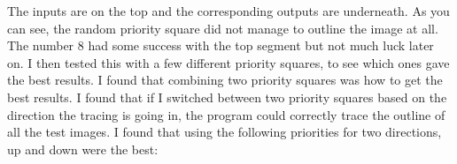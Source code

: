 \documentclass{report}
\begin{document}
\begin{figure}[H]
    \centering
    \label{fig:Test with Example Priority Box}
\end{figure}
\noindent The inputs are on the top and the corresponding outputs are underneath. As you can see, the random priority square did not manage to outline the image at all. The number 8 had some success with the top segment but not much luck later on.
\newline
I then tested this with a few different priority squares, to see which ones gave the best results. I found that combining two priority squares was how to get the best results. I found that if I switched between two priority squares based on the direction the tracing is going in, the program could correctly trace the outline of all the test images. I found that using the following priorities for two directions, up and down were the best:
\end{document}
